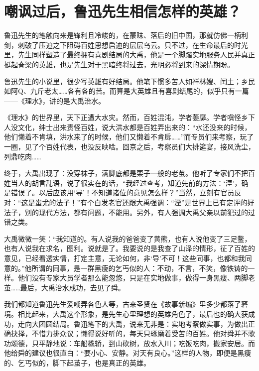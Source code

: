 
\section*{嘲讽过后，鲁迅先生相信怎样的英雄？}

鲁迅先生的笔触向来是锋利且冷峻的，在蒙昧、落后的旧中国，那就仿佛一柄利剑，刺破了压迫之下阻碍百姓思想启迪的层层乌云。只不过，在生命最后的时光里，先生同样塑造了最终拥有喜剧结局的大禹，他是一个脚踏实地服务人民并真正挺起脊梁的英雄，也是先生对于黑暗终将过去，光明必将到来的深情期盼。

鲁迅先生的小说里，很少写英雄有好结局。他笔下惯多苦人如祥林嫂、闰土；乡民如阿Q、九斤老太……各有各的苦。而算是大英雄且有喜剧结尾的，似乎只有一篇——《理水》，讲的是大禹治水。

《理水》的世界里，天下正遭大水灾。然而，百姓混沌，学者萎靡。学者嗔怪乡下人没文化，绅士出来责怪百姓，说大洪水都是百姓弄出来的：“水还没来的时候，他们懒着不肯填，洪水来了的时候，他们又懒着不肯戽……”而专员们来考察，玩了一圈，见了个百姓代表，也没反映啥。回京之后，考察员们大排筵宴，接风洗尘，列鼎吃肉……

终于，大禹出现了：没穿袜子，满脚底都是栗子一般的老茧。他听了专家们不把百姓当人的胡言乱语，说了很实在的话，“我经过查考，知道先前的方法：‘湮’，确是错误了。以后应该用‘导’！不知道诸位的意见怎么样？”当然，立刻有官员反对：“这是蚩尤的法子！”有个白发老官还跟大禹强调：“湮”是世界上已有定评的好法子，别的现代方法，都有问题，不能用。另外，有人强调大禹父亲以前犯过的过错之类。

大禹微微一笑：“我知道的。有人说我的爸爸变了黄熊，也有人说他变了三足鳖，也有人说我在求名，图利。说就是了。我要说的是我查了山泽的情形，征了百姓的意见，已经看透实情，打定主意，无论如何，非‘导’不可！这些同事，也都和我同意的。”他所谓的同事，是一群黑瘦的乞丐似的人：不动，不言，不笑，像铁铸的一样。他们没有专家大员学者那么能忽悠，只是在实地做事，做得一身黑瘦、两脚老茧……最后，大禹治水成功，去见了舜。

我们都知道鲁迅先生爱嘲弄各色人等，古来圣贤在《故事新编》里多少都落了窘境。相比起来，大禹这个形象，是先生心里理想的英雄角色了，最后也的确大获成功，走向大团圆结局。鲁迅笔下的大禹，说来无非是：实地考察做实事，为做出正确抉择，不惜力排众议；懒得说好听的，每天只琢磨着受苦的百姓。他对舜并不歌功颂德，只平静地说：车船橇轿，到山砍树，放水入川；吃饭吃肉，搬家安居。而他给舜的建议也很直白：“要小心、安静。对天有良心。”这样的人物，即便是黑瘦的、乞丐似的，脚下起茧子，也是真正的英雄。

